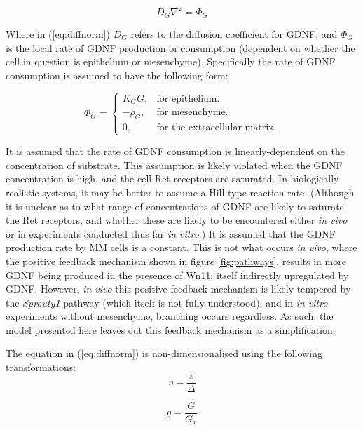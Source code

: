 \documentclass[pdftex,10pt,a4paper,twocolumn]{article}
\begin{document}
\begin{equation}\label{eq:diffnorm}
D_G \nabla^2 = \Phi_G
\end{equation}

Where in (\ref{eq:diffnorm}) $D_G$ refers to the diffusion coefficient for GDNF, and $\Phi_G$ is the local rate of GDNF production or consumption (dependent on whether the cell in question is epithelium or mesenchyme). Specifically the rate of GDNF consumption is assumed to have the following form:

\begin{equation} \label{eq:production}
\Phi_G =\begin{cases}
K_G G, & \text{for epithelium}.\\
-\rho_G, & \text{for mesenchyme}.\\
0, & \text{for the extracellular matrix}.
\end{cases}
\end{equation}

It is assumed that the rate of GDNF consumption is linearly-dependent on the concentration of substrate. This assumption is likely violated when the GDNF concentration is high, and the cell Ret-receptors are saturated. In biologically realistic systems, it may be better to assume a Hill-type reaction rate. (Although it is unclear as to what range of concentrations of GDNF are likely to saturate the Ret receptors, and whether these are likely to be encountered either \textit{in vivo} or in experiments conducted thus far \textit{in vitro}.) It is assumed that the GDNF production rate by MM cells is a constant. This is not what occurs \textit{in vivo}, where the positive feedback mechanism shown in figure \ref{fig:pathways}, results in more GDNF being produced in the presence of Wn11; itself indirectly upregulated by GDNF. However, \textit{in vivo} this positive feedback mechanism is likely tempered by the \textit{Sprouty1} pathway (which itself is not fully-understood), and in \textit{in vitro} experiments without mesenchyme, branching occurs regardless. As such, the model presented here leaves out this feedback mechanism as a simplification.

The equation in (\ref{eq:diffnorm}) is non-dimensionalised using the following transformations:
\begin{equation}\label{eq:difftrans1}
\eta = \frac{x}{\Delta}
\end{equation}

\begin{equation}\label{eq:difftrans2}
g = \frac{G}{G_x}
\end{equation}
\end{document}
